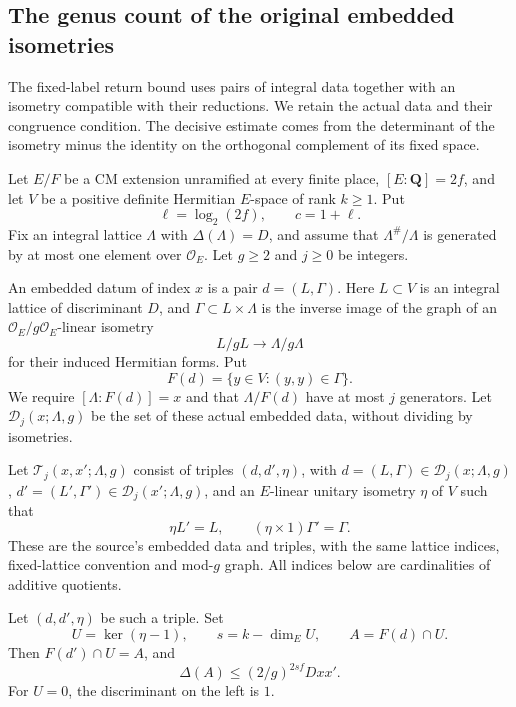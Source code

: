 \subsection{The genus count of the original embedded isometries}
\label{sec:embedded-isometry-genus-count}

The fixed-label return bound uses pairs of integral data together
with an isometry compatible with their reductions.  We retain the
actual data and their congruence condition.  The decisive estimate
comes from the determinant of the isometry minus the identity on
the orthogonal complement of its fixed space.

Let \(E/F\) be a CM extension unramified at every finite place,
\([E:\mathbf Q]=2f\), and let \(V\) be a positive definite
Hermitian \(E\)-space of rank \(k\geq1\).  Put
\[
 \ell=\log_2(2f),\qquad c=1+\ell.
\]
Fix an integral lattice \(\Lambda\) with
\(\Delta(\Lambda)=D\), and assume that
\(\Lambda^\#/\Lambda\) is generated by at most one element
over \(\mathcal O_E\).  Let \(g\geq2\) and \(j\geq0\) be integers.

An embedded datum of index \(x\) is a pair \(d=(L,\Gamma)\).
Here \(L\subset V\) is an integral lattice of discriminant \(D\),
and \(\Gamma\subset L\times\Lambda\) is the inverse image of the
graph of an \(\mathcal O_E/g\mathcal O_E\)-linear isometry
\[
                         L/gL\longrightarrow\Lambda/g\Lambda
\]
for their induced Hermitian forms.  Put
\[
 F(d)=\{y\in V:(y,y)\in\Gamma\}.
 \tag{EI1}
\]
We require
\([\Lambda:F(d)]=x\) and that \(\Lambda/F(d)\) have at most
\(j\) generators.  Let \(\mathcal D_j(x;\Lambda,g)\) be the
set of these actual embedded data, without dividing by
isometries.

Let \(\mathcal T_j(x,x';\Lambda,g)\) consist of triples
\((d,d',\eta)\), with \(d=(L,\Gamma)\in\mathcal D_j(x;\Lambda,g)\),
\(d'=(L',\Gamma')\in\mathcal D_j(x';\Lambda,g)\), and an
\(E\)-linear unitary isometry \(\eta\) of \(V\) such that
\[
       \eta L'=L,\qquad (\eta\times1)\Gamma'=\Gamma.
 \tag{EI2}
\]
These are the source's embedded data and triples, with the same
lattice indices, fixed-lattice convention and mod-\(g\) graph.
\cite{embedded-isometry-count-source}
All indices below are cardinalities of additive quotients.

\begin{lemma}
\label{lem:embedded-isometry-fixed-discriminant}
Let \((d,d',\eta)\) be such a triple.  Set
\[
 U=\ker(\eta-1),\qquad s=k-\dim_EU,\qquad
                  A=F(d)\cap U.
\]
Then \(F(d')\cap U=A\), and
\[
                 \Delta(A)\leq(2/g)^{2sf}Dxx'.
 \tag{EI3}
\]
For \(U=0\), the discriminant on the left is \(1\).
\end{lemma}

